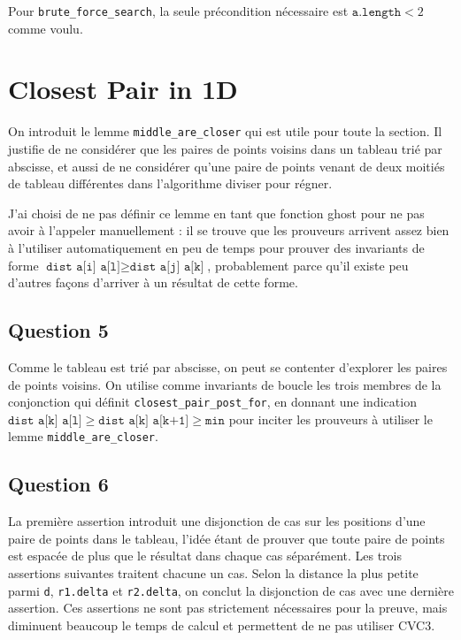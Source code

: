 \documentclass[11pt, openany, a4paper]{article}
\newcommand{\alength}{\texttt{a.length} }
\newcommand{\dist}{\texttt{dist} }
\newcommand{\clofor}{\texttt{closest\_pair\_post\_for}}
\begin{document}
Pour \texttt{brute\_force\_search}, la seule précondition nécessaire est $\alength < 2$ comme voulu. 

\section{Closest Pair in 1D}

On introduit le lemme \texttt{middle\_are\_closer} qui est utile pour toute la section. Il justifie de ne considérer que les paires de points voisins dans un tableau trié par abscisse, et aussi de ne considérer qu'une paire de points venant de deux moitiés de tableau différentes dans l'algorithme diviser pour régner.

J'ai choisi de ne pas définir ce lemme en tant que fonction ghost pour ne pas avoir à l'appeler manuellement : il se trouve que les prouveurs arrivent assez bien à l'utiliser automatiquement en peu de temps pour prouver des invariants de forme $\dist \texttt{ a[i] a[l]} \geq \dist \texttt{ a[j] a[k]}$, probablement parce qu'il existe peu d'autres façons d'arriver à un résultat de cette forme.

\subsection*{Question 5}

Comme le tableau est trié par abscisse, on peut se contenter d'explorer les paires de points voisins. On utilise comme invariants de boucle les trois membres de la conjonction qui définit \clofor, en donnant une indication $\dist \texttt{ a[k] a[l]} \geq \dist \texttt{ a[k] a[k+1]} \geq \texttt{min}$ pour inciter les prouveurs à utiliser le lemme \texttt{middle\_are\_closer}.

\subsection*{Question 6}

La première assertion introduit une disjonction de cas sur les positions d'une paire de points dans le tableau, l'idée étant de prouver que toute paire de points est espacée de plus que le résultat dans chaque cas séparément. Les trois assertions suivantes traitent chacune un cas. Selon la distance la plus petite parmi \texttt{d}, \texttt{r1.delta} et \texttt{r2.delta}, on conclut la disjonction de cas avec une dernière assertion. Ces assertions ne sont pas strictement nécessaires pour la preuve, mais diminuent beaucoup le temps de calcul et permettent de ne pas utiliser CVC3.
\end{document}
